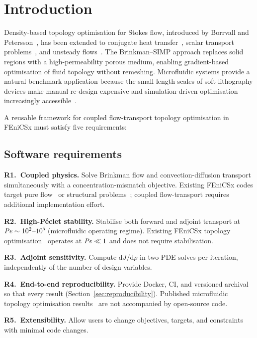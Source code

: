\section{Introduction}
\label{sec:introduction}

Density-based topology optimisation for Stokes flow, introduced by
Borrvall and Petersson~\cite{borrvall2003}, has been extended to
conjugate heat transfer~\cite{alexandersen2014}, scalar transport
problems~\cite{makhija2015}, and unsteady flows~\cite{kreissl2011}.
The Brinkman--SIMP approach replaces solid regions with a high-permeability
porous medium, enabling gradient-based optimisation of fluid topology
without remeshing.
Microfluidic systems provide a natural benchmark application because the
small length scales of soft-lithography devices make manual re-design
expensive and simulation-driven optimisation increasingly accessible~\cite{whitesides2006}.

A reusable framework for coupled flow-transport topology optimisation
in FEniCSx must satisfy five requirements:

\subsection*{Software requirements}

\textbf{R1.~Coupled physics.}
Solve Brinkman flow and convection-diffusion transport simultaneously
with a concentration-mismatch objective.
Existing FEniCSx codes target pure flow~\cite{borrvall2003}
or structural problems~\cite{dokken2023};
coupled flow-transport requires additional implementation effort.

\textbf{R2.~High-P\'{e}clet stability.}
Stabilise both forward and adjoint transport at
$\mathit{Pe}\sim10^2$--$10^5$ (microfluidic operating regime).
Existing FEniCSx topology optimisation~\cite{dokken2023}
operates at $\mathit{Pe}\ll1$ and does not require stabilisation.

\textbf{R3.~Adjoint sensitivity.}
Compute $\mathrm{d}J/\mathrm{d}\rho$ in two PDE solves
per iteration, independently of the number of design variables.

\textbf{R4.~End-to-end reproducibility.}
Provide Docker, CI, and versioned archival so that every result
(Section~\ref{sec:reproducibility}).
Published microfluidic topology optimisation results~\cite{na2022,feppon2024}
are not accompanied by open-source code.

\textbf{R5.~Extensibility.}
Allow users to change objectives, targets, and constraints
with minimal code changes.

